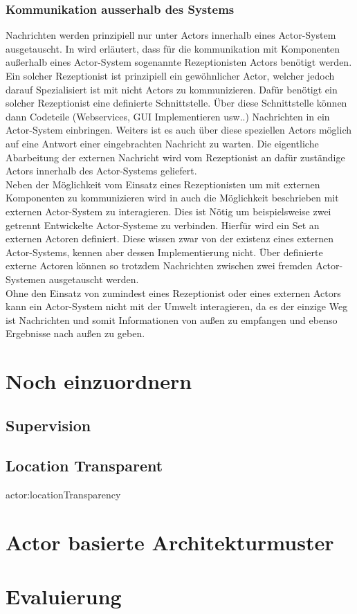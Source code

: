 \subsubsection{Kommunikation ausserhalb des Systems}
Nachrichten werden prinzipiell nur unter Actors innerhalb eines Actor-System ausgetauscht. In \cite{Agha1985ActorsSystems} wird erläutert, dass für die kommunikation mit Komponenten außerhalb eines Actor-System sogenannte Rezeptionisten Actors benötigt werden.\\
Ein solcher Rezeptionist ist prinzipiell ein gewöhnlicher Actor, welcher jedoch darauf Spezialisiert ist mit nicht Actors zu kommunizieren. Dafür benötigt ein solcher Rezeptionist eine definierte Schnittstelle. Über diese Schnittstelle können dann Codeteile (Webservices, GUI Implementieren usw..) Nachrichten in ein Actor-System einbringen. Weiters ist es auch über diese speziellen Actors möglich auf eine Antwort einer eingebrachten Nachricht zu warten. Die eigentliche Abarbeitung der externen Nachricht wird vom Rezeptionist an dafür zuständige Actors innerhalb des Actor-Systems geliefert.\citep{Agha1985ActorsSystems}\\
Neben der Möglichkeit vom Einsatz eines Rezeptionisten um mit externen Komponenten zu kommunizieren wird in \cite{Agha1985ActorsSystems} auch die Möglichkeit beschrieben mit externen Actor-System zu interagieren. Dies ist Nötig um beispielsweise zwei getrennt Entwickelte Actor-Systeme zu verbinden. Hierfür wird ein Set an externen Actoren definiert. Diese wissen zwar von der existenz eines externen Actor-Systems, kennen aber dessen Implementierung nicht. Über definierte externe Actoren können so trotzdem Nachrichten zwischen zwei fremden Actor-Systemen ausgetauscht werden. \\
Ohne den Einsatz von zumindest eines Rezeptionist oder eines externen Actors kann ein Actor-System nicht mit der Umwelt interagieren, da es der einzige Weg ist Nachrichten und somit Informationen von außen zu empfangen und ebenso Ergebnisse nach außen zu geben. 



\section{Noch einzuordnern}
\subsection{Supervision}\label{actor:supervision}
\subsection{Location Transparent}{actor:locationTransparency}
\section{Actor basierte Architekturmuster}
\label{theory:actorArchitecture}
\section{Evaluierung}
